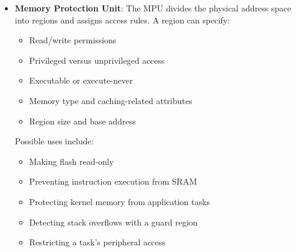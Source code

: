 \documentclass{report}
\begin{document}
\begin{itemize}
\begin{ccode}
{                    while (1) {
                        // milliseconds is updated once per millisecond
                    }
                }
            \end{ccode}
            \begin{enumerate}
                \item SysTick counts downward while the processor executes main().
                \item The counter reaches zero.
                \item SysTick raises an interrupt request.
                \item The processor temporarily pauses main().
                \item The processor executes SysTick\_Handler().
                \item The handler increments milliseconds.
                \item The processor returns to the interrupted location in main()
            \end{enumerate}
        \item \textbf{Memory Protection Unit}: The MPU divides the physical address space into regions and assigns access rules.
            \bigbreak \noindent 
            A region can specify:
            \begin{itemize}
                \item Read/write permissions
                \item Privileged versus unprivileged access
                \item Executable or execute-never
                \item Memory type and caching-related attributes
                \item Region size and base address
            \end{itemize}
            Possible uses include:
            \begin{itemize}
                \item Making flash read-only
                \item Preventing instruction execution from SRAM
                \item Protecting kernel memory from application tasks
                \item Detecting stack overflows with a guard region
                \item Restricting a task’s peripheral access
            \end{itemize}

\end{itemize}
\end{document}
